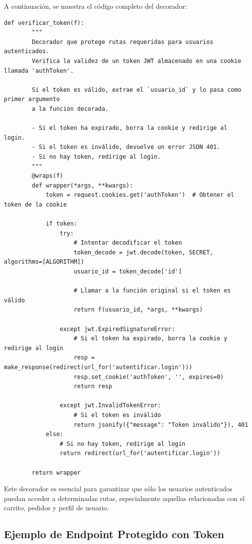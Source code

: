 \documentclass[10pt]{book}
\begin{document}
A continuación, se muestra el código completo del decorador:

\begin{lstlisting}[style=pythonclean, caption={Decorador verificar\_token}]
    def verificar_token(f):
        """
        Decorador que protege rutas requeridas para usuarios autenticados.
        Verifica la validez de un token JWT almacenado en una cookie llamada 'authToken'.
    
        Si el token es válido, extrae el `usuario_id` y lo pasa como primer argumento
        a la función decorada.
    
        - Si el token ha expirado, borra la cookie y redirige al login.
        - Si el token es inválido, devuelve un error JSON 401.
        - Si no hay token, redirige al login.
        """
        @wraps(f)
        def wrapper(*args, **kwargs):
            token = request.cookies.get('authToken')  # Obtener el token de la cookie
            
            if token:
                try:
                    # Intentar decodificar el token
                    token_decode = jwt.decode(token, SECRET, algorithms=[ALGORITHM])
                    usuario_id = token_decode['id']
                    
                    # Llamar a la función original si el token es válido
                    return f(usuario_id, *args, **kwargs)
                
                except jwt.ExpiredSignatureError:
                    # Si el token ha expirado, borra la cookie y redirige al login
                    resp = make_response(redirect(url_for('autentificar.login')))
                    resp.set_cookie('authToken', '', expires=0)
                    return resp
                
                except jwt.InvalidTokenError:
                    # Si el token es inválido
                    return jsonify({"message": "Token inválido"}), 401
            else:
                # Si no hay token, redirige al login
                return redirect(url_for('autentificar.login'))
        
        return wrapper
\end{lstlisting}

Este decorador es esencial para garantizar que sólo los usuarios autenticados puedan acceder a determinadas rutas, especialmente aquellas relacionadas con el carrito, pedidos y perfil de usuario.

\subsection{Ejemplo de Endpoint Protegido con Token}
\end{document}
